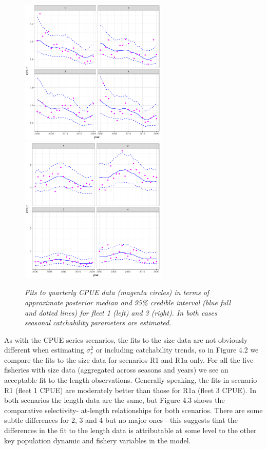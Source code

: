 \documentclass[12pt,a4paper,twoside,times,sky,standard]{csiroreport2017}
\newcommand{\sigr}{\sigma^2_r}
\begin{document}
\begin{figure}[hb]
    \begin{center}
        \includegraphics[width=7cm,height=7cm]{figs/case4_cpuefits.pdf}\includegraphics[width=7cm,height=7cm]{figs/case4a_cpuefits.pdf}
    \end{center}
    \caption{\textit{Fits to quarterly CPUE data (magenta circles) in terms of approximate posterior
median and 95\% credible interval (blue full and dotted lines) for fleet 1 (left) and 3 (right). In both
cases seasonal catchability parameters are estimated.}}
\end{figure}

As with the CPUE series scenarios, the fits to the size data are not obviously different when
estimating $\sigr$ or including catchability trends, so in Figure 4.2 we compare the fits to the size
data for scenarios R1 and R1a only. For all the five fisheries with size data (aggregated across
seasons and years) we see an acceptable fit to the length observations. Generally speaking, the
fits in scenario R1 (fleet 1 CPUE) are moderately better than those for R1a (fleet 3 CPUE). In
both scenarios the length data are the same, but Figure 4.3 shows the comparative selectivity-
at-length relationships for both scenarios. There are some subtle differences for 2, 3 and 4 but
no major ones - this suggests that the differences in the fit to the length data is attributable at
some level to the other key population dynamic and fishery variables in the model.
\end{document}

